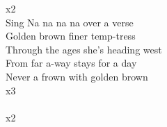           x2\\
Sing Na na na na over a verse\\
 Golden  brown  finer temp-tress\\
 Through the  ages  she's heading  west\\
 From far a-way  stays for a  day\\
 Never a  frown  with golden  brown\\
          x3\\
      \\
          x2\\
\\
